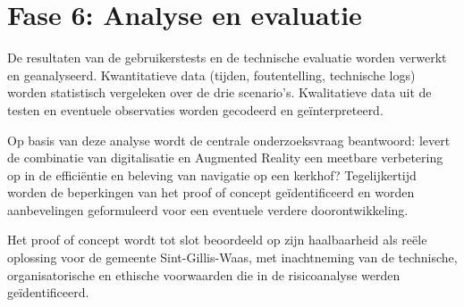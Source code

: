 \section{Fase 6: Analyse en evaluatie}

De resultaten van de gebruikerstests en de technische evaluatie worden verwerkt en geanalyseerd. Kwantitatieve data (tijden, foutentelling, technische logs) worden statistisch vergeleken over de drie scenario's. Kwalitatieve data uit de testen en eventuele observaties worden gecodeerd en geïnterpreteerd.

Op basis van deze analyse wordt de centrale onderzoeksvraag beantwoord: levert de combinatie van digitalisatie en Augmented Reality een meetbare verbetering op in de efficiëntie en beleving van navigatie op een kerkhof? Tegelijkertijd worden de beperkingen van het proof of concept geïdentificeerd en worden aanbevelingen geformuleerd voor een eventuele verdere doorontwikkeling.

Het proof of concept wordt tot slot beoordeeld op zijn haalbaarheid als reële oplossing voor de gemeente Sint-Gillis-Waas, met inachtneming van de technische, organisatorische en ethische voorwaarden die in de risicoanalyse werden geïdentificeerd.